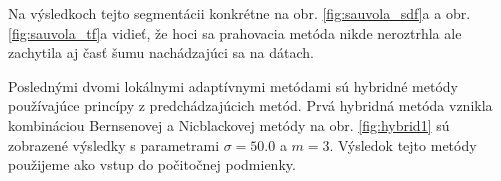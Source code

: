 \documentclass[a4paper,11pt,oneside]{article}%
\begin{document}
Na výsledkoch tejto segmentácii konkrétne na obr. \ref{fig:sauvola_sdf}a a obr. \ref{fig:sauvola_tf}a vidieť, že hoci sa prahovacia metóda nikde neroztrhla ale zachytila aj časť šumu nachádzajúci sa na dátach.

Poslednými dvomi lokálnymi adaptívnymi metódami sú hybridné metódy používajúce princípy z predchádzajúcich metód. 
Prvá hybridná metóda vznikla kombináciou Bernsenovej a Nicblackovej metódy na obr. \ref{fig:hybrid1}  sú zobrazené výsledky s parametrami $\sigma = 50.0$ a $m = 3$. Výsledok tejto metódy použijeme ako vstup do počitočnej podmienky.

\begin{figure}[H]  
    \hspace{5px}

\end{figure}
\end{document}
